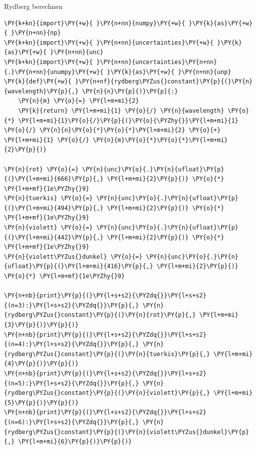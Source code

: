     
    Rydberg berechnen

    \begin{tcolorbox}[breakable, size=fbox, boxrule=1pt, pad at break*=1mm,colback=cellbackground, colframe=cellborder]
\begin{Verbatim}[commandchars=\\\{\}]
\PY{k+kn}{import}\PY{+w}{ }\PY{n+nn}{numpy}\PY{+w}{ }\PY{k}{as}\PY{+w}{ }\PY{n+nn}{np}
\PY{k+kn}{import}\PY{+w}{ }\PY{n+nn}{uncertainties}\PY{+w}{ }\PY{k}{as}\PY{+w}{ }\PY{n+nn}{unc}
\PY{k+kn}{import}\PY{+w}{ }\PY{n+nn}{uncertainties}\PY{n+nn}{.}\PY{n+nn}{unumpy}\PY{+w}{ }\PY{k}{as}\PY{+w}{ }\PY{n+nn}{unp}
\PY{k}{def}\PY{+w}{ }\PY{n+nf}{rydberg\PYZus{}constant}\PY{p}{(}\PY{n}{wavelength}\PY{p}{,} \PY{n}{n}\PY{p}{)}\PY{p}{:}
    \PY{n}{m} \PY{o}{=} \PY{l+m+mi}{2} 
    \PY{k}{return} \PY{l+m+mi}{1} \PY{o}{/} \PY{n}{wavelength} \PY{o}{*} \PY{l+m+mi}{1}\PY{o}{/}\PY{p}{(}\PY{o}{\PYZhy{}}\PY{l+m+mi}{1} \PY{o}{/} \PY{n}{n}\PY{o}{*}\PY{o}{*}\PY{l+m+mi}{2} \PY{o}{+} \PY{l+m+mi}{1} \PY{o}{/} \PY{n}{m}\PY{o}{*}\PY{o}{*}\PY{l+m+mi}{2}\PY{p}{)}

\PY{n}{rot} \PY{o}{=} \PY{n}{unc}\PY{o}{.}\PY{n}{ufloat}\PY{p}{(}\PY{l+m+mi}{666}\PY{p}{,} \PY{l+m+mi}{2}\PY{p}{)} \PY{o}{*} \PY{l+m+mf}{1e\PYZhy{}9}
\PY{n}{tuerkis} \PY{o}{=} \PY{n}{unc}\PY{o}{.}\PY{n}{ufloat}\PY{p}{(}\PY{l+m+mi}{494}\PY{p}{,} \PY{l+m+mi}{2}\PY{p}{)} \PY{o}{*} \PY{l+m+mf}{1e\PYZhy{}9}
\PY{n}{violett} \PY{o}{=} \PY{n}{unc}\PY{o}{.}\PY{n}{ufloat}\PY{p}{(}\PY{l+m+mi}{442}\PY{p}{,} \PY{l+m+mi}{2}\PY{p}{)} \PY{o}{*} \PY{l+m+mf}{1e\PYZhy{}9}
\PY{n}{violett\PYZus{}dunkel} \PY{o}{=} \PY{n}{unc}\PY{o}{.}\PY{n}{ufloat}\PY{p}{(}\PY{l+m+mi}{416}\PY{p}{,} \PY{l+m+mi}{2}\PY{p}{)} \PY{o}{*} \PY{l+m+mf}{1e\PYZhy{}9}

\PY{n+nb}{print}\PY{p}{(}\PY{l+s+s2}{\PYZdq{}}\PY{l+s+s2}{(n=3):}\PY{l+s+s2}{\PYZdq{}}\PY{p}{,} \PY{n}{rydberg\PYZus{}constant}\PY{p}{(}\PY{n}{rot}\PY{p}{,} \PY{l+m+mi}{3}\PY{p}{)}\PY{p}{)}
\PY{n+nb}{print}\PY{p}{(}\PY{l+s+s2}{\PYZdq{}}\PY{l+s+s2}{(n=4):}\PY{l+s+s2}{\PYZdq{}}\PY{p}{,} \PY{n}{rydberg\PYZus{}constant}\PY{p}{(}\PY{n}{tuerkis}\PY{p}{,} \PY{l+m+mi}{4}\PY{p}{)}\PY{p}{)}
\PY{n+nb}{print}\PY{p}{(}\PY{l+s+s2}{\PYZdq{}}\PY{l+s+s2}{(n=5):}\PY{l+s+s2}{\PYZdq{}}\PY{p}{,} \PY{n}{rydberg\PYZus{}constant}\PY{p}{(}\PY{n}{violett}\PY{p}{,} \PY{l+m+mi}{5}\PY{p}{)}\PY{p}{)}
\PY{n+nb}{print}\PY{p}{(}\PY{l+s+s2}{\PYZdq{}}\PY{l+s+s2}{(n=6):}\PY{l+s+s2}{\PYZdq{}}\PY{p}{,} \PY{n}{rydberg\PYZus{}constant}\PY{p}{(}\PY{n}{violett\PYZus{}dunkel}\PY{p}{,} \PY{l+m+mi}{6}\PY{p}{)}\PY{p}{)}


\end{Verbatim}
\end{tcolorbox}
